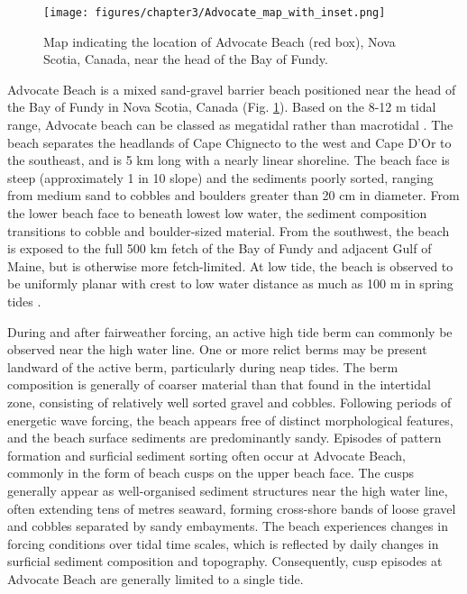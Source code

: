 \documentclass[preprint,12pt,authoryear]{elsarticle}
\begin{document}
\begin{figure}[tbp] %
	\texttt{[image: figures/chapter3/Advocate\_map\_with\_inset.png]}
	\caption{Map indicating the location of Advocate Beach (red box), Nova Scotia, Canada, near the head of the Bay of Fundy. \label{fig:Advocate_map}}
\end{figure}

Advocate Beach is a mixed sand-gravel barrier beach positioned near the head of the Bay of Fundy in Nova Scotia, Canada (Fig. \ref{fig:Advocate_map}). Based on the 8-12 m tidal range, Advocate beach can be classed as megatidal rather than macrotidal \citep{Levoy_etal2000}. The beach separates the headlands of Cape Chignecto to the west and Cape D'Or to the southeast, and is 5 km long with a nearly linear shoreline. The beach face is steep (approximately 1 in 10 slope) and the sediments poorly sorted, ranging from medium sand to cobbles and boulders greater than 20 cm in diameter. From the lower beach face to beneath lowest low water, the sediment composition transitions to cobble and boulder-sized material. From the southwest, the beach is exposed to the full 500 km fetch of the Bay of Fundy and adjacent Gulf of Maine, but is otherwise more fetch-limited. At low tide, the beach is observed to be uniformly planar with crest to low water distance as much as 100 m in spring tides \citep[see][]{Taylor_etal1985, Hay_etal2014}. 

During and after fairweather forcing, an active high tide berm can commonly be observed near the high water line. One or more relict berms may be present landward of the active berm, particularly during neap tides. The berm composition is generally of coarser material than that found in the intertidal zone, consisting of relatively well sorted gravel and cobbles. Following periods of energetic wave forcing, the beach appears free of distinct morphological features, and the beach surface sediments are predominantly sandy. Episodes of pattern formation and surficial sediment sorting often occur at Advocate Beach, commonly in the form of beach cusps on the upper beach face. The cusps generally appear as well-organised sediment structures near the high water line, often extending tens of metres seaward, forming cross-shore bands of loose gravel and cobbles separated by sandy embayments. The beach experiences changes in forcing conditions over tidal time scales, which is reflected by daily changes in surficial sediment composition and topography. Consequently, cusp episodes at Advocate Beach are generally limited to a single tide.
\end{document}

